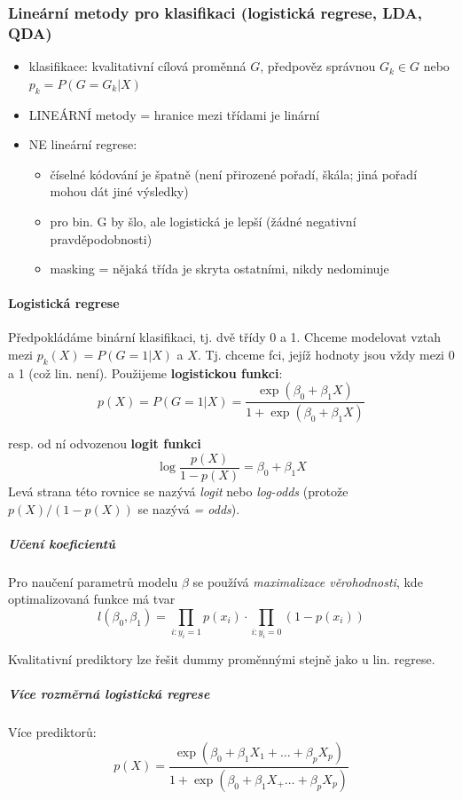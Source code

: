 \documentclass[11pt]{report} %
\numberwithin{equation}{section}
\begin{document}
\subsubsection{Lineární metody pro klasifikaci (logistická regrese, LDA, QDA)}
  \begin{itemize}
	\item klasifikace: kvalitativní cílová proměnná $G$, předpověz správnou $G_k \in G$ nebo $p_k = P(G=G_k | X)$
	\item LINEÁRNÍ metody = hranice mezi třídami je linární
	\item NE lineární regrese:
	\begin{itemize}
		\item číselné kódování je špatně (není přirozené pořadí, škála; jiná pořadí mohou dát jiné výsledky)
		\item pro bin. G by šlo, ale logistická je lepší (žádné negativní pravděpodobnosti)
		\item masking = nějaká třída je skryta ostatními, nikdy nedominuje
	\end{itemize}
	\end{itemize}
	\paragraph{Logistická regrese}
	Předpokládáme binární klasifikaci, tj. dvě třídy 0 a 1. Chceme modelovat vztah mezi $p_k(X) = P(G=1 | X)$ a $X$. Tj. chceme fci, jejíž hodnoty jsou vždy mezi 0 a 1 (což lin. není). Použijeme \textbf{logistickou funkci}:
	$$p(X) = P(G=1 | X) = \frac{\exp(\beta_0 + \beta_1X)}{1 + \exp(\beta_0 + \beta_1 X)}$$
	
	resp. od ní odvozenou \textbf{logit funkci}
	$$\log\frac{p(X)}{1 - p(X)} = \beta_0 + \beta_1 X$$
	Levá strana této rovnice se nazývá \textit{logit} nebo \textit{log-odds} (protože $p(X)/(1-p(X))$ se nazývá \textit{ = odds}). 
	
	\subparagraph{Učení koeficientů}
	Pro naučení parametrů modelu $\beta$ se používá \textit{maximalizace věrohodnosti}, kde optimalizovaná funkce má tvar $$l(\beta_0,\beta_1) = \prod_{i : y_i = 1} p(x_i) \cdot \prod_{i : y_i = 0} (1-p(x_i))$$
	
	Kvalitativní prediktory lze řešit dummy proměnnými stejně jako u lin. regrese.

	\subparagraph{Více rozměrná logistická regrese}
	Více prediktorů:
	$$p(X) = \frac{\exp(\beta_0 + \beta_1X_1 + \dots + \beta_pX_p)}{1 + \exp(\beta_0 + \beta_1 X_ + \dots + \beta_pX_p)}$$
	
\end{document}
